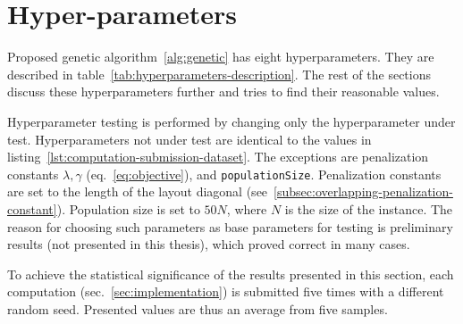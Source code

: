 \newpage


\section{Hyper-parameters}\label{sec:hyper-parameters}

Proposed genetic algorithm~\ref{alg:genetic} has eight hyperparameters.
They are described in table~\ref{tab:hyperparameters-description}.
The rest of the sections discuss these hyperparameters further and tries to find their reasonable values.

Hyperparameter testing is performed by changing only the hyperparameter under test.
Hyperparameters not under test are identical to the values in listing~\ref{lst:computation-submission-dataset}.
The exceptions are penalization constants $\lambda, \gamma$ (eq.~\ref{eq:objective}), and \verb|populationSize|.
Penalization constants are set to the length of the layout diagonal (see~\ref{subsec:overlapping-penalization-constant}).
Population size is set to $50N$, where $N$ is the size of the instance.
The reason for choosing such parameters as base parameters for testing
is preliminary results (not presented in this thesis), which proved correct in many cases.

To achieve the statistical significance of the results presented in this section, each computation (sec.~\ref{sec:implementation}) is submitted five times with a different random seed.
Presented values are thus an average from five samples.


